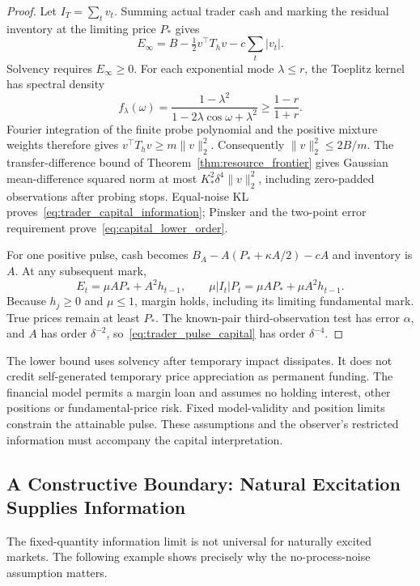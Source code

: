 \documentclass[11pt]{article}
\begin{document}
\begin{proof}
Let $I_T=\sum_t v_t$. Summing actual trader cash and marking the residual inventory at the limiting price $P_*$ gives
\[
E_\infty=B-\tfrac12v^\top T_hv-c\sum_t|v_t|.
\]
Solvency requires $E_\infty\ge0$. For each exponential mode $\lambda\le r$, the Toeplitz kernel has spectral density
\[
f_\lambda(\omega)=\frac{1-\lambda^2}{1-2\lambda\cos\omega+\lambda^2}
\ge\frac{1-r}{1+r}.
\]
Fourier integration of the finite probe polynomial and the positive mixture weights therefore gives
$v^\top T_hv\ge m\|v\|_2^2$.
Consequently $\|v\|_2^2\le2B/m$.
The transfer-difference bound of Theorem~\ref{thm:resource_frontier} gives Gaussian mean-difference squared norm at most $K_*^2\delta^4\|v\|_2^2$, including zero-padded observations after probing stops. Equal-noise KL proves~\eqref{eq:trader_capital_information}; Pinsker and the two-point error requirement prove~\eqref{eq:capital_lower_order}.

For one positive pulse, cash becomes $B_A-A(P_*+\kappa A/2)-cA$ and inventory is $A$. At any subsequent mark,
\[
E_t=\mu A P_*+A^2h_{t-1},\qquad
\mu|I_t|P_t=\mu A P_*+\mu A^2h_{t-1}.
\]
Because $h_j\ge0$ and $\mu\le1$, margin holds, including its limiting fundamental mark. True prices remain at least $P_*$. The known-pair third-observation test has error $\alpha$, and $A$ has order $\delta^{-2}$, so~\eqref{eq:trader_pulse_capital} has order $\delta^{-4}$.
\end{proof}

The lower bound uses solvency after temporary impact dissipates. It does not credit self-generated temporary price appreciation as permanent funding. The financial model permits a margin loan and assumes no holding interest, other positions or fundamental-price risk. Fixed model-validity and position limits constrain the attainable pulse. These assumptions and the observer's restricted information must accompany the capital interpretation.


\subsection{A Constructive Boundary: Natural Excitation Supplies Information}
\label{sec:natural_excitation}
The fixed-quantity information limit is not universal for naturally excited markets. The following example shows precisely why the no-process-noise assumption matters.
\end{document}
